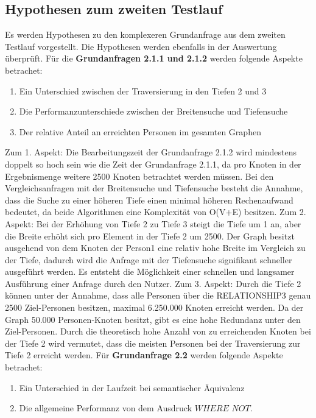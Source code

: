 \subsection{Hypothesen zum zweiten Testlauf}
Es werden Hypothesen zu den komplexeren Grundanfrage aus dem zweiten Testlauf vorgestellt. Die Hypothesen werden ebenfalls in der Auswertung überprüft. \newline \newline
Für die \textbf{Grundanfragen 2.1.1 und 2.1.2} werden folgende Aspekte betrachet: 
\begin{enumerate}
	\item Ein Unterschied zwischen der Traversierung in den Tiefen 2 und 3 
	\item Die Performanzunterschiede zwischen der Breitensuche und Tiefensuche
	\item Der relative Anteil an erreichten Personen im gesamten Graphen
\end{enumerate}
Zum 1. Aspekt: Die Bearbeitungszeit der Grundanfrage 2.1.2 wird mindestens doppelt so hoch sein wie die Zeit der Grundanfrage 2.1.1, da pro Knoten in der Ergebnismenge weitere 2500 Knoten betrachtet werden müssen. Bei den Vergleichsanfragen mit der  Breitensuche und Tiefensuche besteht die Annahme, dass die Suche zu einer höheren Tiefe einen minimal höheren Rechenaufwand bedeutet, da beide Algorithmen eine Komplexität von O(V+E) besitzen. \newline
Zum 2. Aspekt: Bei der Erhöhung von Tiefe 2 zu Tiefe 3 steigt die Tiefe um 1 an, aber die Breite erhöht sich pro Element in der Tiefe 2 um 2500. Der Graph besitzt ausgehend von dem Knoten der Person1 eine relativ hohe Breite im Vergleich zu der Tiefe, dadurch wird die Anfrage mit der Tiefensuche signifikant schneller ausgeführt werden. Es entsteht die Möglichkeit einer schnellen und langsamer Ausführung einer Anfrage durch den Nutzer. \newline
Zum 3. Aspekt: Durch die Tiefe 2 können unter der Annahme, dass alle Personen über die RELATIONSHIP3 genau 2500 Ziel-Personen besitzen, maximal 6.250.000 Knoten erreicht werden. Da der Graph 50.000 Personen-Knoten besitzt, gibt es eine hohe Redundanz unter den Ziel-Personen. Durch die theoretisch hohe Anzahl von zu erreichenden Knoten bei der Tiefe 2 wird vermutet, dass die meisten Personen bei der Traversierung zur Tiefe 2 erreicht werden. \newline \newline
Für \textbf{Grundanfrage 2.2} werden folgende Aspekte betrachet: 
\begin{enumerate}
	\item Ein Unterschied in der Laufzeit bei  semantischer Äquivalenz  
	\item Die allgemeine Performanz von dem Ausdruck $WHERE$ $NOT$.
\end{enumerate}
